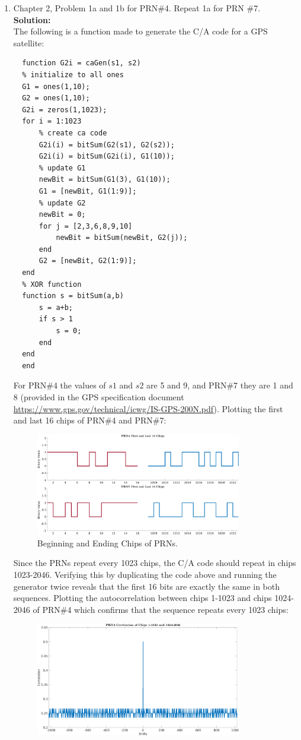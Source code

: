 \documentclass[11pt]{article}
\newcommand{\solution}{\textbf{Solution: \\}}
\begin{document}
\begin{enumerate}[label=\textbf{\arabic*.}]
  \vspace{24pt}
  \item Chapter 2, Problem 1a and 1b for PRN\#4. Repeat 1a for PRN \#7. \\
  \solution
  The following is a function made to generate the C/A code for a GPS 
  satellite:
  \begin{lstlisting}
  function G2i = caGen(s1, s2)
  % initialize to all ones
  G1 = ones(1,10);
  G2 = ones(1,10);
  G2i = zeros(1,1023);
  for i = 1:1023
      % create ca code
      G2i(i) = bitSum(G2(s1), G2(s2));
      G2i(i) = bitSum(G2i(i), G1(10));
      % update G1
      newBit = bitSum(G1(3), G1(10));
      G1 = [newBit, G1(1:9)];
      % update G2
      newBit = 0;
      for j = [2,3,6,8,9,10]
          newBit = bitSum(newBit, G2(j));
      end
      G2 = [newBit, G2(1:9)];
  end
  % XOR function
  function s = bitSum(a,b)
      s = a+b;
      if s > 1
          s = 0;
      end
  end
  end
  \end{lstlisting}
  For PRN\#4 the values of $s1$ and $s2$ are 5 and 9, and PRN\#7 they are 
  1 and 8 (provided in the GPS specification document 
  \url{https://www.gps.gov/technical/icwg/IS-GPS-200N.pdf}). Plotting the first 
  and last 16 chips of PRN\#4 and PRN\#7:
  \begin{figure}[H]
    \centering
    \includegraphics[width=0.85\textwidth]{6a.png}
    \caption{Beginning and Ending Chips of PRNs.}
  \end{figure}
  Since the PRNs repeat every 1023 chips, the C/A code should repeat in chips 
  1023-2046. Verifying this by duplicating the code above and running the 
  generator twice reveals that the first 16 bits are exactly the same in both 
  sequences. Plotting the autocorrelation between chips 1-1023 and chips 
  1024-2046 of PRN\#4 which confirms that the sequence repeats every 1023 chips:
  \begin{figure}[H]
    \centering
    \includegraphics[width=0.85\textwidth]{6b.png}

\end{figure}
\end{enumerate}
\end{document}
